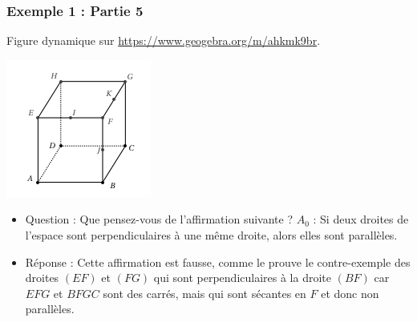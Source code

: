 \documentclass[xcolor=svgnames,t,final]{beamer}
\begin{document}
\begin{frame}

\frametitle{Exemple 1 : Partie 5}

Figure dynamique sur \href{https://www.geogebra.org/m/ahkmk9br}{https://www.geogebra.org/m/ahkmk9br}.


\begin{center}
\includegraphics[scale=0.4]{images/exemple1.png}
\end{center}

\begin{itemize}
\pause \item {\color{blue} Question : Que pensez-vous de l'affirmation suivante  ?  $A_{0}$ : \og{} Si deux droites de l'espace  sont perpendiculaires à une même droite, alors elles sont parallèles. \og{}}
\pause \item {\color{red} Réponse :  Cette affirmation est fausse, comme le prouve le contre-exemple des droites $(EF)$ et $(FG)$ qui sont perpendiculaires à la droite $(BF)$ car $EFG$ et $BFGC$ sont des carrés, mais qui sont sécantes en $F$ et donc non parallèles.
}
\end{itemize}


\end{frame}
\end{document}

